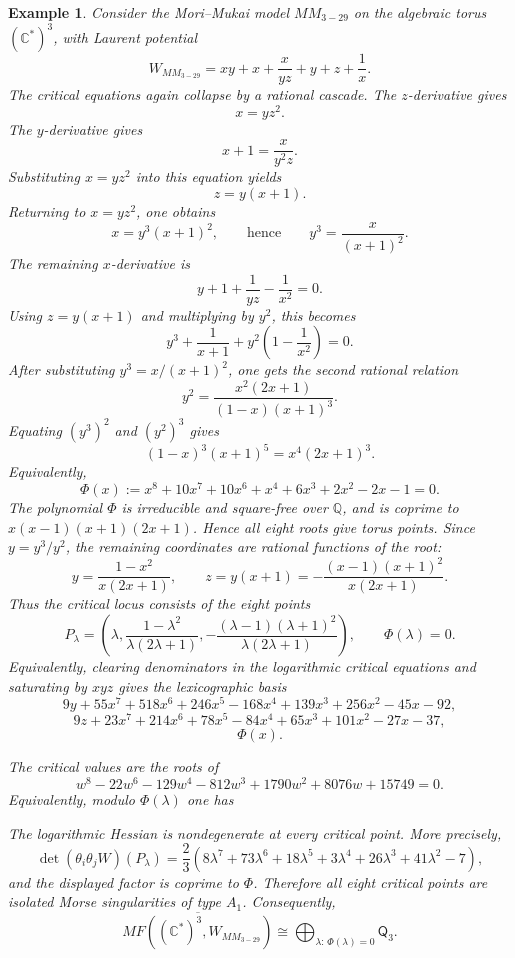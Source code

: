 \documentclass[11pt]{amsart}
\newtheorem{example}{Example}[section]
\newcommand{\MorseCat}[1]{\mathsf{Q}_{#1}}
\newcommand{\fitdisplay}[1]{%
  \begin{center}%
  \resizebox{\textwidth}{!}{$\displaystyle #1$}%
  \end{center}%
}
\begin{document}
\begin{example}
Consider the Mori--Mukai model $MM_{3-29}$ on the algebraic torus
$(\mathbb{C}^*)^3$, with Laurent potential
\[
W_{MM_{3-29}}=xy+x+\frac{x}{yz}+y+z+\frac{1}{x}.
\]
The critical equations again collapse by a rational cascade. The $z$-derivative
gives
\[
x=yz^2.
\]
The $y$-derivative gives
\[
x+1=\frac{x}{y^2z}.
\]
Substituting $x=yz^2$ into this equation yields
\[
z=y(x+1).
\]
Returning to $x=yz^2$, one obtains
\[
x=y^3(x+1)^2,
\qquad\text{hence}\qquad
y^3=\frac{x}{(x+1)^2}.
\]
The remaining $x$-derivative is
\[
y+1+\frac{1}{yz}-\frac{1}{x^2}=0.
\]
Using $z=y(x+1)$ and multiplying by $y^2$, this becomes
\[
y^3+\frac{1}{x+1}+y^2\left(1-\frac{1}{x^2}\right)=0.
\]
After substituting $y^3=x/(x+1)^2$, one gets the second rational relation
\[
y^2=\frac{x^2(2x+1)}{(1-x)(x+1)^3}.
\]
Equating $(y^3)^2$ and $(y^2)^3$ gives
\[
(1-x)^3(x+1)^5=x^4(2x+1)^3.
\]
Equivalently,
\[
\Phi(x):=x^8+10x^7+10x^6+x^4+6x^3+2x^2-2x-1=0.
\]
The polynomial $\Phi$ is irreducible and square-free over $\mathbb{Q}$, and is
coprime to $x(x-1)(x+1)(2x+1)$. Hence all eight roots give torus points. Since
$y=y^3/y^2$, the remaining coordinates are rational functions of the root:
\[
y=\frac{1-x^2}{x(2x+1)},
\qquad
z=y(x+1)=-\frac{(x-1)(x+1)^2}{x(2x+1)}.
\]
Thus the critical locus consists of the eight points
\[
P_\lambda=\left(
\lambda,
\frac{1-\lambda^2}{\lambda(2\lambda+1)},
-\frac{(\lambda-1)(\lambda+1)^2}{\lambda(2\lambda+1)}
\right),
\qquad
\Phi(\lambda)=0.
\]
Equivalently, clearing denominators in the logarithmic critical equations and
saturating by $xyz$ gives the lexicographic basis
\[
9y+55x^7+518x^6+246x^5-168x^4+139x^3+256x^2-45x-92,
\]
\[
9z+23x^7+214x^6+78x^5-84x^4+65x^3+101x^2-27x-37,
\]
\[
\Phi(x).
\]

The critical values are the roots of
\[
w^8-22w^6-129w^4-812w^3+1790w^2+8076w+15749=0.
\]
Equivalently, modulo $\Phi(\lambda)$ one has
\fitdisplay{W_{MM_{3-29}}(P_\lambda)=
-\frac{1}{3}\left(20\lambda^7+184\lambda^6+48\lambda^5-84\lambda^4
+62\lambda^3+83\lambda^2-36\lambda-31\right)}
The logarithmic Hessian is nondegenerate at every critical point. More
precisely,
\[
\det(\theta_i\theta_jW)(P_\lambda)
=\frac{2}{3}\left(8\lambda^7+73\lambda^6+18\lambda^5+3\lambda^4
+26\lambda^3+41\lambda^2-7\right),
\]
and the displayed factor is coprime to $\Phi$. Therefore all eight critical
points are isolated Morse singularities of type $A_1$. Consequently,
\[
\overline{MF((\mathbb{C}^*)^3,W_{MM_{3-29}})}
\cong \bigoplus_{\lambda:\,\Phi(\lambda)=0}\MorseCat{3}.
\]
\end{example}
\end{document}
